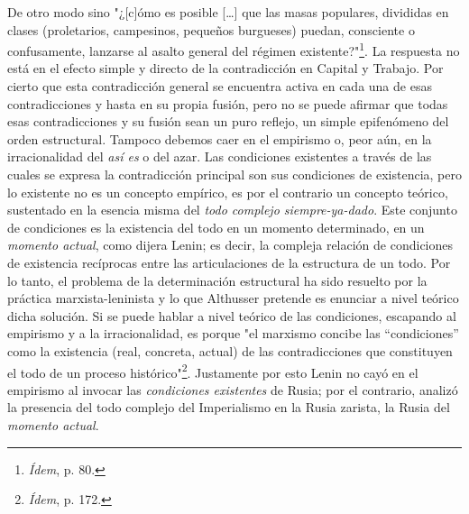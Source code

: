 \documentclass{book}
\begin{document}
De otro modo sino "¿{[}c{]}ómo es posible {[}\ldots{]} que las masas
populares, divididas en clases (proletarios, campesinos, pequeños
burgueses) puedan, consciente o confusamente, lanzarse al asalto general
del régimen existente?"\footnote{\emph{Ídem}, p. 80.}. La respuesta no
está en el efecto simple y directo de la contradicción en Capital y
Trabajo. Por cierto que esta contradicción general se encuentra activa
en cada una de esas contradicciones y hasta en su propia fusión, pero no
se puede afirmar que todas esas contradicciones y su fusión sean un puro
reflejo, un simple epifenómeno del orden estructural. Tampoco debemos
caer en el empirismo o, peor aún, en la irracionalidad del \emph{así es}
o del azar. Las condiciones existentes a través de las cuales se expresa
la contradicción principal son sus condiciones de existencia, pero lo
existente no es un concepto empírico, es por el contrario un concepto
teórico, sustentado en la esencia misma del \emph{todo complejo
siempre-ya-dado}. Este conjunto de condiciones es la existencia del todo
en un momento determinado, en un \emph{momento actual}, como dijera
Lenin; es decir, la compleja relación de condiciones de existencia
recíprocas entre las articulaciones de la estructura de un todo. Por lo
tanto, el problema de la determinación estructural ha sido resuelto por
la práctica marxista-leninista y lo que Althusser pretende es enunciar a
nivel teórico dicha solución. Si se puede hablar a nivel teórico de las
condiciones, escapando al empirismo y a la irracionalidad, es porque "el
marxismo concibe las ``condiciones'' como la existencia (real, concreta,
actual) de las contradicciones que constituyen el todo de un proceso
histórico"\footnote{\emph{Ídem}, p. 172.}. Justamente por esto Lenin no
cayó en el empirismo al invocar las \emph{condiciones existentes} de
Rusia; por el contrario, analizó la presencia del todo complejo del
Imperialismo en la Rusia zarista, la Rusia del \emph{momento actual}.
\end{document}
